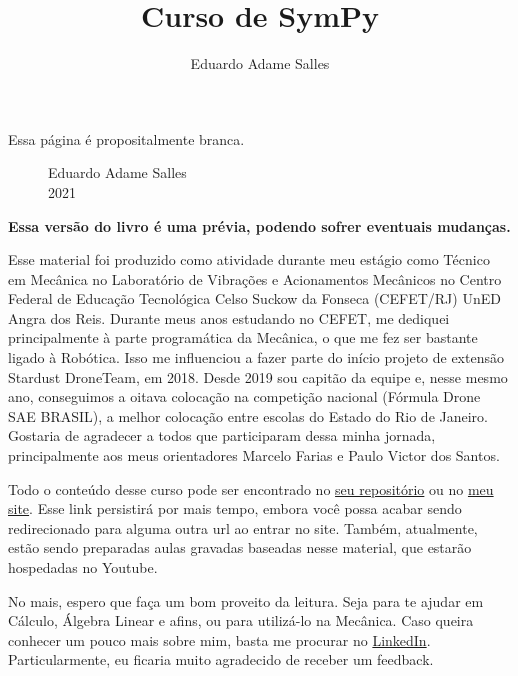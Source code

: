 \documentclass[a4paper, 11pt, brazilian]{article}
\title{Curso de SymPy}
\author{Eduardo Adame Salles}
\begin{document}
    
    
    \newpage
    \thispagestyle{empty}
    \begin{center}
    Essa página é propositalmente branca.
    \end{center}
    \begin{figure}[!b]
    \begin{flushleft}
    Eduardo Adame Salles\\


    2021

    \end{flushleft}
    \end{figure}
    
    \newpage
    \thispagestyle{empty}
    
    \begin{center}
    \textbf{Essa versão do livro é uma prévia, podendo sofrer eventuais mudanças.}
    \end{center}
    
    \vspace{2cm}
    
    
    Esse material foi produzido como atividade durante meu estágio como Técnico em Mecânica no Laboratório de Vibrações e Acionamentos Mecânicos no Centro Federal de Educação Tecnológica Celso Suckow da Fonseca (CEFET/RJ) UnED Angra dos Reis. Durante meus anos estudando no CEFET, me dediquei principalmente à parte programática da Mecânica, o que me fez ser bastante ligado à Robótica. Isso me influenciou a fazer parte do início projeto de extensão Stardust DroneTeam, em 2018. Desde 2019 sou capitão da equipe e, nesse mesmo ano, conseguimos a oitava colocação na competição nacional (Fórmula Drone SAE BRASIL), a melhor colocação entre escolas do Estado do Rio de Janeiro. Gostaria de agradecer a todos que participaram dessa minha jornada, principalmente aos meus orientadores Marcelo Farias e Paulo Victor dos Santos. 
    
    Todo o conteúdo desse curso pode ser encontrado no \href{https://www.github.com/adamesalles/cursosympy}{seu repositório} ou no \href{https://adamesalles.github.io/cursosympy}{meu site}. Esse link persistirá por mais tempo, embora você possa acabar sendo redirecionado para alguma outra url ao entrar no site. Também, atualmente, estão sendo preparadas aulas gravadas baseadas nesse material, que estarão hospedadas no Youtube.
    
    No mais, espero que faça um bom proveito da leitura. Seja para te ajudar em Cálculo, Álgebra Linear e afins, ou para utilizá-lo na Mecânica. Caso queira conhecer um pouco mais sobre mim, basta me procurar no \href{https://www.linkedin.com/in/eadamesalles/}{LinkedIn}. Particularmente, eu ficaria muito agradecido de receber um feedback. 
    
\end{document}
